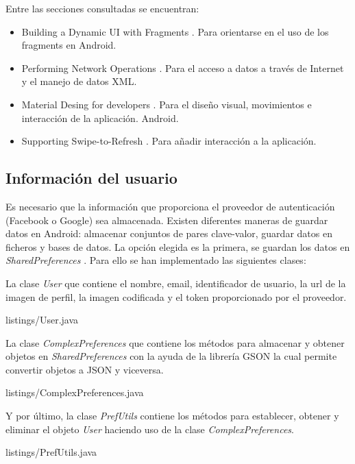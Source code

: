Entre las secciones consultadas se encuentran:
\begin{itemize}
\item Building a Dynamic UI with Fragments \cite{URL::Fragments}. Para orientarse en el uso de los fragments en Android.
\item Performing Network Operations \cite{URL::Network}. Para el acceso a datos a través de Internet y el manejo de datos XML.
\item Material Desing for developers \cite{URL::MaterialDesing}. Para el diseño visual, movimientos e interacción de la aplicación.
Android.
\item Supporting Swipe-to-Refresh \cite{URL::Swipe}. Para añadir interacción a la aplicación.
\end{itemize}

\subsection{Información del usuario}
Es necesario que la información que proporciona el proveedor de autenticación (Facebook o Google) sea almacenada. Existen diferentes maneras de guardar datos \cite{URL::SavingData} en Android: almacenar conjuntos de pares clave-valor, guardar datos en ficheros y bases de datos. La opción elegida es la primera, se guardan los datos en \textit{SharedPreferences} \cite{URL::SharedPreferences}. Para ello se han implementado las siguientes clases:
\newline

La clase \textit{User} que contiene el nombre, email, identificador de usuario, la url de la imagen de perfil, la imagen codificada y el token proporcionado por el proveedor.
\newline

{listings/User.java} %

La clase \textit{ComplexPreferences} que contiene los métodos para almacenar y obtener objetos en \textit{SharedPreferences} con la ayuda de la librería GSON \cite{URL::Gson} la cual permite convertir objetos a JSON y viceversa.


{listings/ComplexPreferences.java} %

Y por último, la clase \textit{PrefUtils} contiene los métodos para establecer, obtener y eliminar el objeto \textit{User} haciendo uso de la clase \textit{ComplexPreferences}.
\newline

{listings/PrefUtils.java} %

